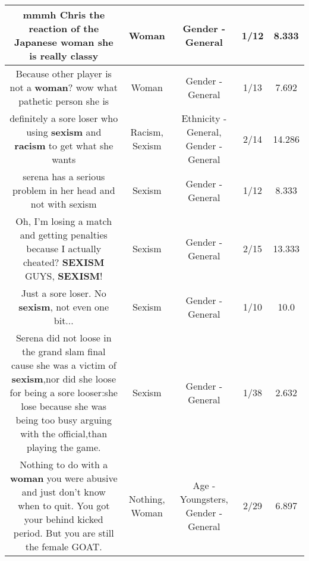 \documentclass[11pt]{article}
\newlength\mylength
\begin{document}
\begin{center}
\begin{longtable}{|C{.65\mylength}|C{.30\mylength}|C{.12\mylength}|C{.12\mylength}|C{.12\mylength}|}
  \small mmmh Chris the reaction of the Japanese \textbf{woman} she is really classy\normalsize   & Woman & Gender - General & 1/12 & 8.333 \\  \hline
  \small Because other player is not a \textbf{woman}? wow what pathetic person she is\normalsize   & Woman & Gender - General & 1/13 & 7.692 \\  \hline
  \small definitely a sore loser who using \textbf{sexism} and \textbf{racism} to get what she wants\normalsize   & Racism, Sexism & Ethnicity - General, Gender - General & 2/14 & 14.286 \\  \hline
  \small serena has a serious problem in her head and not with sexism\normalsize   & Sexism & Gender - General & 1/12 & 8.333 \\  \hline
  \small Oh, I'm losing a match and getting penalties because I actually cheated? \textbf{SEXISM} GUYS, \textbf{SEXISM}!\normalsize   & Sexism & Gender - General & 2/15 & 13.333 \\  \hline
  \small Just a sore loser. No \textbf{sexism}, not even one bit...\normalsize   & Sexism & Gender - General & 1/10 & 10.0 \\  \hline
  \small Serena did not loose in the grand slam final cause she was a victim of \textbf{sexism},nor did she loose for being a sore looser:she lose because she was being too busy arguing with the official,than playing the game.\normalsize   & Sexism & Gender - General & 1/38 & 2.632 \\  \hline
  \small Nothing to do with a \textbf{woman} you were abusive and just don't know when to quit. You got your behind kicked period. But you are still the female GOAT.\normalsize   & Nothing, Woman & Age - Youngsters, Gender - General & 2/29 & 6.897 \\  \hline

\end{longtable}
\end{center}
\end{document}
